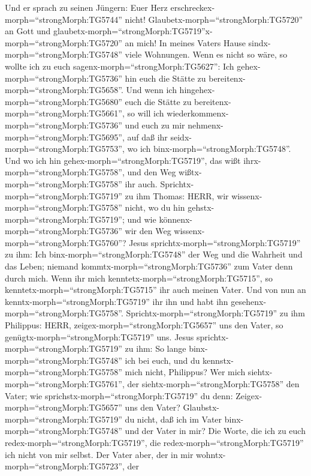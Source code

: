  Und er sprach zu seinen Jüngern: Euer Herz
erschreckex-morph=``strongMorph:TG5744'' nicht!
Glaubetx-morph=``strongMorph:TG5720'' an Gott und
glaubetx-morph=``strongMorph:TG5719''\textbar x-morph=``strongMorph:TG5720''
an mich!  In meines Vaters Hause
sindx-morph=``strongMorph:TG5748'' viele Wohnungen. Wenn es nicht so
wäre, so wollte ich zu euch sagenx-morph=``strongMorph:TG5627'': Ich
gehex-morph=``strongMorph:TG5736'' hin euch die Stätte zu
bereitenx-morph=``strongMorph:TG5658''.  Und wenn ich
hingehex-morph=``strongMorph:TG5680'' euch die Stätte zu
bereitenx-morph=``strongMorph:TG5661'', so will ich
wiederkommenx-morph=``strongMorph:TG5736'' und euch zu mir
nehmenx-morph=``strongMorph:TG5695'', auf daß ihr
seidx-morph=``strongMorph:TG5753'', wo ich
binx-morph=``strongMorph:TG5748''.  Und wo ich hin
gehex-morph=``strongMorph:TG5719'', das wißt
ihrx-morph=``strongMorph:TG5758'', und den Weg
wißtx-morph=``strongMorph:TG5758'' ihr auch. 
Sprichtx-morph=``strongMorph:TG5719'' zu ihm Thomas: HERR, wir
wissenx-morph=``strongMorph:TG5758'' nicht, wo du hin
gehstx-morph=``strongMorph:TG5719''; und wie
könnenx-morph=``strongMorph:TG5736'' wir den Weg
wissenx-morph=``strongMorph:TG5760''?  Jesus
sprichtx-morph=``strongMorph:TG5719'' zu ihm: Ich
binx-morph=``strongMorph:TG5748'' der Weg und die Wahrheit und das
Leben; niemand kommtx-morph=``strongMorph:TG5736'' zum Vater denn durch
mich.  Wenn ihr mich kenntetx-morph=``strongMorph:TG5715'',
so kenntetx-morph=``strongMorph:TG5715'' ihr auch meinen Vater. Und von
nun an kenntx-morph=``strongMorph:TG5719'' ihr ihn und habt ihn
gesehenx-morph=``strongMorph:TG5758''. 
Sprichtx-morph=``strongMorph:TG5719'' zu ihm Philippus: HERR,
zeigex-morph=``strongMorph:TG5657'' uns den Vater, so
genügtx-morph=``strongMorph:TG5719'' uns.  Jesus
sprichtx-morph=``strongMorph:TG5719'' zu ihm: So lange
binx-morph=``strongMorph:TG5748'' ich bei euch, und du
kennstx-morph=``strongMorph:TG5758'' mich nicht, Philippus? Wer mich
siehtx-morph=``strongMorph:TG5761'', der
siehtx-morph=``strongMorph:TG5758'' den Vater; wie
sprichstx-morph=``strongMorph:TG5719'' du denn:
Zeigex-morph=``strongMorph:TG5657'' uns den Vater? 
Glaubstx-morph=``strongMorph:TG5719'' du nicht, daß ich im Vater
binx-morph=``strongMorph:TG5748'' und der Vater in mir? Die Worte, die
ich zu euch redex-morph=``strongMorph:TG5719'', die
redex-morph=``strongMorph:TG5719'' ich nicht von mir selbst. Der Vater
aber, der in mir wohntx-morph=``strongMorph:TG5723'', der

